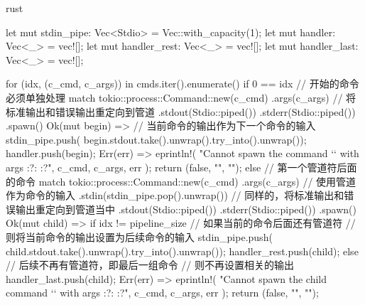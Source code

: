 \begin{code-block}{rust}
{    let mut stdin_pipe: Vec<Stdio> = Vec::with_capacity(1);
    let mut handler: Vec<_> = vec![];
    let mut handler_rest: Vec<_> = vec![];
    let mut handler_last: Vec<_> = vec![];

    for (idx, (c_cmd, c_args)) in cmds.iter().enumerate() {
        if 0 == idx {
            // 开始的命令必须单独处理
            match tokio::process::Command::new(c_cmd)
                .args(c_args)
                // 将标准输出和错误输出重定向到管道
                .stdout(Stdio::piped())
                .stderr(Stdio::piped())
                .spawn()
            {
                Ok(mut begin) => {
                    // 当前命令的输出作为下一个命令的输入
                    stdin_pipe.push(
                        begin.stdout.take().unwrap().try_into().unwrap());
                    handler.push(begin);
                }
                Err(err) => {
                    eprintln!(
                        "Cannot spawn the command `{}` with args {:?}: {:?}",
                        c_cmd, c_args, err
                    );
                    return (false, "", "");
                }
            }
        } else {
            // 第一个管道符后面的命令
            match tokio::process::Command::new(c_cmd)
                .args(c_args)
                // 使用管道作为命令的输入
                .stdin(stdin_pipe.pop().unwrap())
                // 同样的，将标准输出和错误输出重定向到管道当中
                .stdout(Stdio::piped())
                .stderr(Stdio::piped())
                .spawn()
            {
                Ok(mut child) => {
                    if idx != pipeline_size {
                        // 如果当前的命令后面还有管道符
                        // 则将当前命令的输出设置为后续命令的输入
                        stdin_pipe.push(
                            child.stdout.take().unwrap().try_into().unwrap());
                        handler_rest.push(child);
                    } else {
                        // 后续不再有管道符，即最后一组命令
                        // 则不再设置相关的输出
                        handler_last.push(child);
                    }
                }
                Err(err) => {
                    eprintln!(
                        "Cannot spawn the child command `{}` with args {:?}: {:?}",
                        c_cmd, c_args, err
                    );
                    return (false, "", "");
                }
            }
        }
    }

}
\end{code-block}
